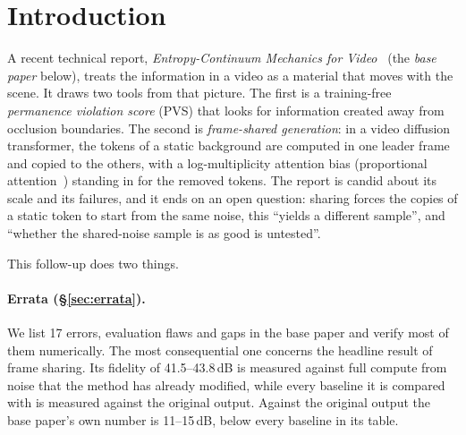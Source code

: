 \section{Introduction}

A recent technical report, \emph{Entropy-Continuum Mechanics for Video}~\cite{garlapati2026ecm} (the \emph{base paper} below), treats the information in a video as a material that moves with the scene.
It draws two tools from that picture.
The first is a training-free \emph{permanence violation score} (PVS) that looks for information created away from occlusion boundaries.
The second is \emph{frame-shared generation}: in a video diffusion transformer, the tokens of a static background are computed in one leader frame and copied to the others, with a log-multiplicity attention bias (proportional attention~\cite{bolya2023tome}) standing in for the removed tokens.
The report is candid about its scale and its failures, and it ends on an open question: sharing forces the copies of a static token to start from the same noise, this ``yields a different sample'', and ``whether the shared-noise sample is as good is untested''.

This follow-up does two things.

\paragraph{Errata (\S\ref{sec:errata}).}
We list 17 errors, evaluation flaws and gaps in the base paper and verify most of them numerically.
The most consequential one concerns the headline result of frame sharing.
Its fidelity of 41.5--43.8\,dB is measured against full compute from noise that the method has already modified, while every baseline it is compared with is measured against the original output.
Against the original output the base paper's own number is 11--15\,dB, below every baseline in its table.

